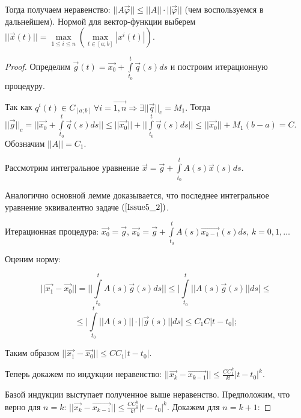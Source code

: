 Тогда получаем неравенство: $||A \overrightarrow{\varphi}|| \leqslant ||A|| \cdot ||\overrightarrow{\varphi}||$ (чем воспользуемся в дальнейшем).
Нормой для вектор-функции выберем $||\overrightarrow{x}(t)|| = \max\limits_{1 \leqslant i \leqslant n} (\max\limits_{t \in [a;b]} |x^i(t)|)$.

\begin{proof}

Определим $\overrightarrow{g}(t) = \overrightarrow{x_0} + \int\limits_{t_0}^{t} \overrightarrow{q}(s)ds$ и построим итерационную процедуру.

Так как $q^i(t) \in C_{[a;b]}\ \forall i = \overrightarrow{1, n} \Rightarrow \exists ||\overrightarrow{q}||_c = M_1.$ Тогда $||\overrightarrow{g}||_c = \Big| \Big|\overrightarrow{x_0} + \int\limits_{t_0}^{t}\overrightarrow{q}(s)ds \Big| \Big| \leqslant ||\overrightarrow{x_0}|| + \Big| \Big| \int\limits_{t_0}^{t}\overrightarrow{q}(s)ds \Big| \Big| \leqslant ||\overrightarrow{x_0}|| + M_1(b-a) = C$. Обозначим $||A|| = C_1$.

Рассмотрим интегральное уравнение $\overrightarrow{x} = \overrightarrow{g} + \int\limits_{t_0}^{t}A(s)\overrightarrow{x}(s)ds$.

Аналогично основной лемме доказывается, что последнее интегральное уравнение эквивалентно задаче $(\ref{Issue5_2})$.

Итерационная процедура: $\overrightarrow{x_0} = \overrightarrow{g}$, $\overrightarrow{x_k} = \overrightarrow{g} + \int\limits_{t_0}^{t} A(s)\overrightarrow{x_{k-1}}(s)ds $, $k = 0, 1, \dots$

Оценим норму:

$$ ||\overrightarrow{x_1} - \overrightarrow{x_0}|| = \Big| \Big| \int\limits_{t_0}^{t} A(s)\overrightarrow{g}(s)ds \Big| \Big| \leqslant \Big| \int\limits_{t_0}^{t} || A(s)\overrightarrow{g}(s) || ds \Big| \leqslant $$
$$\leqslant \Big| \int\limits_{t_0}^{t} || A(s) || \cdot || \overrightarrow{g}(s) || ds \Big| \leqslant C_1 C |t - t_0|;$$ 

Таким образом $||\overrightarrow{x_1} -\overrightarrow{x_0}|| \leqslant CC_1|t-t_0|.$

Теперь докажем по индукции неравенство: $||\overrightarrow{x_k} - \overrightarrow{x_{k-1}}|| \leqslant \frac{CC_1^k}{k!}|t-t_0|^k.$

Базой индукции выступает полученное выше неравенство. Предположим, что верно для $n = k$: $||\overrightarrow{x_k} - \overrightarrow{x_{k-1}}|| \leqslant \frac{CC_1^k}{k!}|t-t_0|^k$. Докажем для $n = k + 1$:


\end{proof}
